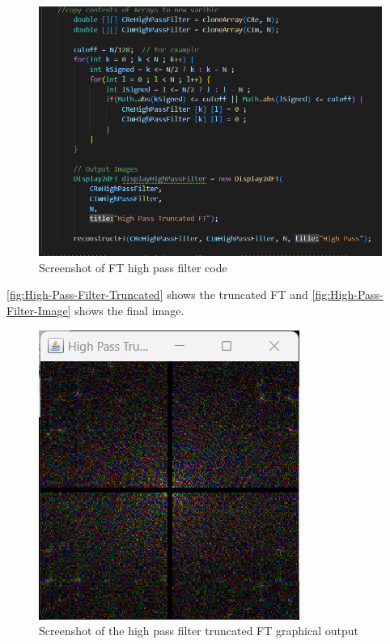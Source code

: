     \begin{figure}[H]
        \centering
        \includegraphics[width=.9\columnwidth]{Figures/Week 1/W1-High-Pass-Code.png}
        \caption{Screenshot of FT high pass filter code}
        \label{fig:High-Pass-Filter-code}
    \end{figure}
    

    \autoref{fig:High-Pass-Filter-Truncated} shows the truncated FT and \autoref{fig:High-Pass-Filter-Image} shows the final image.
      \begin{figure}[H]
        \centering
        \includegraphics[width=0.49\columnwidth]{Figures/Week 1/W1-High-Pass-Truncated.png}
        \caption{Screenshot of the high pass filter truncated FT graphical output}
        \label{fig:High-Pass-Filter-Truncated}
      \end{figure}

